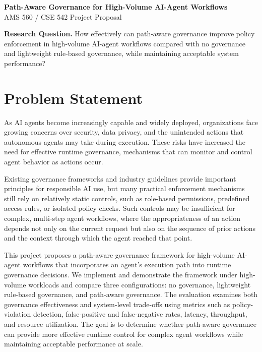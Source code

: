 \documentclass[12pt]{article}
\begin{document}
\begin{center}
{\large\bfseries Path-Aware Governance for High-Volume AI-Agent Workflows}\\[4pt]
{\large AMS 560 / CSE 542 Project Proposal}
\end{center}
\vspace{2pt}

\noindent\textbf{Research Question.} How effectively can path-aware governance improve policy enforcement in high-volume AI-agent workflows compared with no governance and lightweight rule-based governance, while maintaining acceptable system performance?

\section{Problem Statement}
As AI agents become increasingly capable and widely deployed, organizations face growing concerns over security, data privacy, and the unintended actions that autonomous agents may take during execution. These risks have increased the need for effective runtime governance, mechanisms that can monitor and control agent behavior as actions occur.

Existing governance frameworks and industry guidelines provide important principles for responsible AI use, but many practical enforcement mechanisms still rely on relatively static controls, such as role-based permissions, predefined access rules, or isolated policy checks. Such controls may be insufficient for complex, multi-step agent workflows, where the appropriateness of an action depends not only on the current request but also on the sequence of prior actions and the context through which the agent reached that point.

This project proposes a path-aware governance framework for high-volume AI-agent workflows that incorporates an agent's execution path into runtime governance decisions. We implement and demonstrate the framework under high-volume workloads and compare three configurations: no governance, lightweight rule-based governance, and path-aware governance. The evaluation examines both governance effectiveness and system-level trade-offs using metrics such as policy-violation detection, false-positive and false-negative rates, latency, throughput, and resource utilization. The goal is to determine whether path-aware governance can provide more effective runtime control for complex agent workflows while maintaining acceptable performance at scale.
\end{document}
